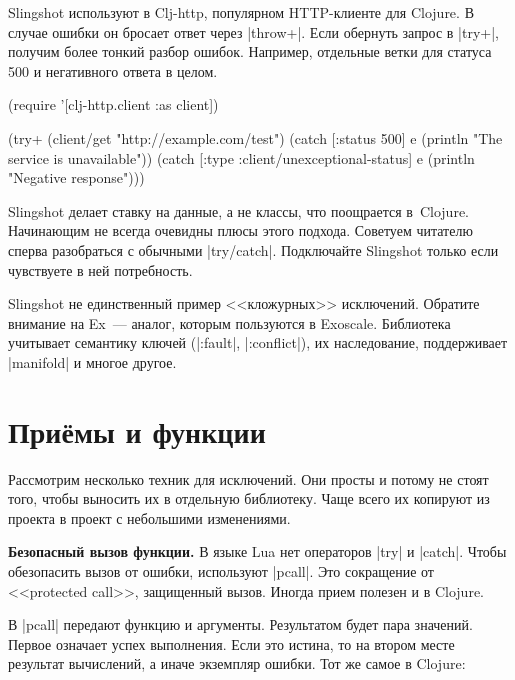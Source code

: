 Slingshot используют в Clj-http,
популярном HTTP-клиенте для Clojure. В случае ошибки он бросает ответ через
\spverb|throw+|. Если обернуть запрос в \spverb|try+|, получим более тонкий
разбор ошибок. Например, отдельные ветки для статуса 500 и негативного ответа в
целом.

\begin{english}
  \begin{clojure}
(require '[clj-http.client :as client])

(try+
 (client/get "http://example.com/test")
 (catch [:status 500] e
   (println "The service is unavailable"))
 (catch [:type :client/unexceptional-status] e
   (println "Negative response")))
  \end{clojure}
\end{english}

Slingshot делает ставку на данные, а не классы, что поощрается
в~Clojure. Начинающим не всегда очевидны плюсы этого подхода. Советуем читателю
сперва разобраться с обычными \spverb|try/catch|. Подключайте Slingshot только
если чувствуете в ней потребность.

Slingshot не единственный пример <<кложурных>> исключений. Обратите внимание на
Ex~--- аналог, которым пользуются в
Exoscale. Библиотека учитывает семантику ключей (\spverb|:fault|,
\spverb|:conflict|), их наследование, поддерживает \spverb|manifold| и многое
другое.

\section{При\"{е}мы и функции}

Рассмотрим несколько техник для исключений. Они просты и потому не стоят того,
чтобы выносить их в отдельную библиотеку. Чаще всего их копируют из проекта в
проект с небольшими изменениями.

\textbf{Безопасный вызов функции.} В языке Lua нет операторов \spverb|try| и
\spverb|catch|. Чтобы обезопасить вызов от ошибки, используют
\spverb|pcall|. Это сокращение от
<<protected call>>, защищенный вызов. Иногда прием полезен и в Clojure.

В \spverb|pcall| передают функцию и аргументы. Результатом будет пара
значений. Первое означает успех выполнения. Если это истина, то на втором месте
результат вычислений, а иначе экземпляр ошибки. Тот же самое в Clojure:

